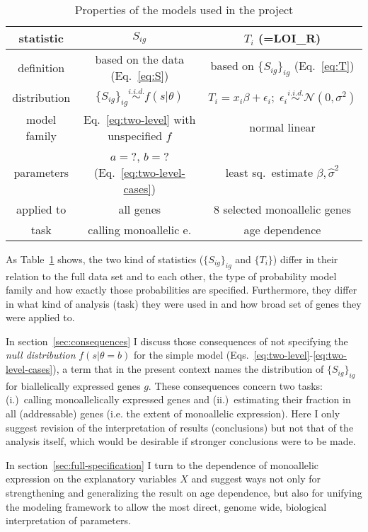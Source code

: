 \documentclass[letterpaper]{article}
\begin{document}
\begin{table}[t]
\label{tab:model-used}
\begin{tabular}{c|c|c|}
statistic & \(S_{ig}\) & \(T_i\) (=LOI\_R) \\
\hline
definition & based on the data (Eq.~\ref{eq:S}) & based on \(\{S_{ig}\}_{ig}\) (Eq.~\ref{eq:T}) \\
distribution & \(\{S_{ig}\}_{ig} \overset{i.i.d.}{\sim} f(s |
\theta) \) &
\(T_{i} = x_i \beta + \epsilon_i; \; \epsilon_i \overset{i.i.d.}{\sim}
\mathcal{N}(0, \sigma^2)\) \\
model family & Eq.~\ref{eq:two-level} with unspecified \(f\)
 & normal linear \\
parameters & \(a=\)?, \(b=\)? (Eq.~\ref{eq:two-level-cases})
& least sq.~estimate \(\hat{\beta}, \hat{\sigma}^2\) \\
applied to & all genes & 8 selected monoallelic genes \\
task & calling monoallelic e. & age dependence \\
\hline
\end{tabular}
\caption{Properties of the models used in the project}
\end{table}

As Table~\ref{tab:model-used} shows, the two kind of statistics
(\(\{S_{ig}\}_{ig}\) and \(\{T_i\}\)) differ in their relation to the full
data set and to each other, the type of probability model family and how
exactly those probabilities are specified.  Furthermore, they differ in what
kind of analysis (task) they were used in and how broad set of genes they were
applied to.

In section~\ref{sec:consequences} I discuss those consequences of not
specifying the \emph{null distribution} \(f(s|\theta=b)\) for the simple model
(Eqs.~\ref{eq:two-level}-\ref{eq:two-level-cases}), a term that in the present
context names the distribution of \(\{S_{ig}\}_{ig}\) for biallelically
expressed genes \(g\).  These consequences concern two tasks: (i.)~calling
monoallelically expressed genes and (ii.)~estimating their fraction in all
(addressable) genes (i.e. the extent of monoallelic expression).  Here I only
suggest revision of the interpretation of results (conclusions) but not that
of the analysis itself, which would be desirable if stronger conclusions were
to be made.

In section~\ref{sec:full-specification} I turn to the dependence of monoallelic
expression on the explanatory variables \(X\) and suggest ways not only for
strengthening and generalizing the result on age dependence, but also for
unifying the modeling framework to allow the most direct, genome wide,
biological interpretation of parameters.
\end{document}
